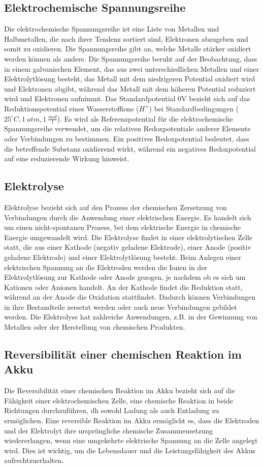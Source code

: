 \documentclass[11pt]{article}
\begin{document}
\subsection{Elektrochemische Spannungsreihe}
Die elektrochemische Spannungsreihe ist eine Liste von Metallen und Halbmetallen, die nach ihrer Tendenz sortiert sind, Elektronen abzugeben und somit zu oxidieren. Die Spannungsreihe gibt an, welche Metalle stärker oxidiert werden können als andere. Die Spannungsreihe beruht auf der Beobachtung, dass in einem galvanischen Element, das aus zwei unterschiedlichen Metallen und einer Elektrolytlösung besteht, das Metall mit dem niedrigeren Potential oxidiert wird und Elektronen abgibt, während das Metall mit dem höheren Potential reduziert wird und Elektronen aufnimmt.
Das Standardpotential 0V bezieht sich auf das Reduktionspotential eines Wasserstoffions ($H^{+}$) bei Standardbedingungen ($25^{\circ}C, 1 \:atm, 1 \:\frac{mol}{l}$). Es wird als Referenzpotential für die elektrochemische Spannungsreihe verwendet, um die relativen Redoxpotentiale anderer Elemente oder Verbindungen zu bestimmen. Ein positives Redoxpotential bedeutet, dass die betreffende Substanz oxidierend wirkt, während ein negatives Redoxpotential auf eine reduzierende Wirkung hinweist.

\subsection{Elektrolyse}
Elektrolyse bezieht sich auf den Prozess der chemischen Zersetzung von Verbindungen durch die Anwendung einer elektrischen Energie. Es handelt sich um einen nicht-spontanen Prozess, bei dem elektrische Energie in chemische Energie umgewandelt wird. Die Elektrolyse findet in einer elektrolytischen Zelle statt, die aus einer Kathode (negativ geladene Elektrode), einer Anode (positiv geladene Elektrode) und einer Elektrolytlösung besteht. Beim Anlegen einer elektrischen Spannung an die Elektroden werden die Ionen in der Elektrolytlösung zur Kathode oder Anode gezogen, je nachdem ob es sich um Kationen oder Anionen handelt. An der Kathode findet die Reduktion statt, während an der Anode die Oxidation stattfindet. Dadurch können Verbindungen in ihre Bestandteile zersetzt werden oder auch neue Verbindungen gebildet werden. Die Elektrolyse hat zahlreiche Anwendungen, z.B. in der Gewinnung von Metallen oder der Herstellung von chemischen Produkten.

\subsection{Reversibilität einer chemischen Reaktion im Akku}
Die Reversibilität einer chemischen Reaktion im Akku bezieht sich auf die Fähigkeit einer elektrochemischen Zelle, eine chemische Reaktion in beide Richtungen durchzuführen, dh sowohl Ladung als auch Entladung zu ermöglichen. Eine reversible Reaktion im Akku ermöglicht es, dass die Elektroden und der Elektrolyt ihre ursprüngliche chemische Zusammensetzung wiedererlangen, wenn eine umgekehrte elektrische Spannung an die Zelle angelegt wird. Dies ist wichtig, um die Lebensdauer und die Leistungsfähigkeit des Akkus aufrechtzuerhalten.
\end{document}

